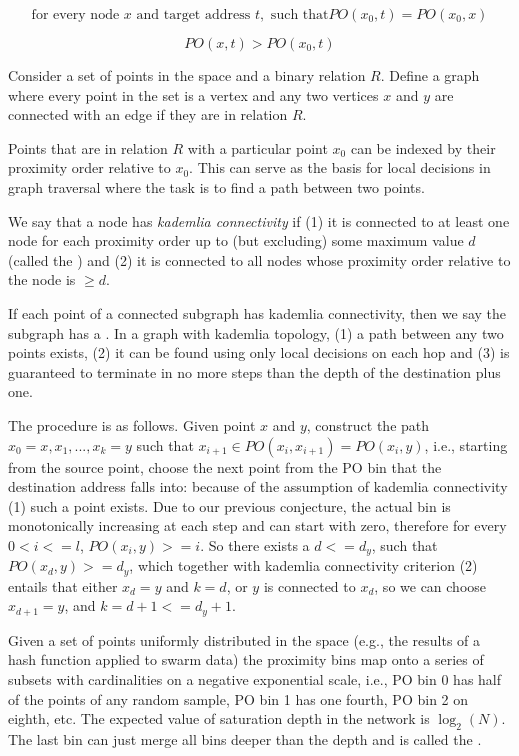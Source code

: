$$
\text{for every node } x \text{ and target address } t, \text{ such that} \mathit{PO}(x_0, t) = \mathit{PO}(x_0,x) 
$$

$$
\mathit{PO}(x, t) > \mathit{PO}(x_0, t) 
$$


Consider a set of points in the space and 
a binary relation $R$. Define a graph where every point in the set is a vertex and any two vertices $x$ and $y$ are  connected with an edge if they are in relation $R$. 

Points that are in relation $R$ with a particular point $x_0$ can be indexed by their proximity order relative to $x_0$. 
This can serve as the basis for local decisions in graph traversal where the task is to find a path between two
points. 

We say that a node has \emph{kademlia connectivity} if (1) it is connected to at least one node for each proximity order up to (but excluding) some maximum value $d$ (called the ) and (2) it is connected to all nodes whose proximity order relative to the node is  $\geqslant d$.

If each point of a connected subgraph has kademlia connectivity, then we say the subgraph has a . In a graph with kademlia topology, (1) a path between any two points exists, (2) it can be found using only local decisions on each hop and (3) is guaranteed to terminate in no more steps than the depth of the destination plus one. 

The procedure is as follows. Given point $x$ and $y$, construct the path $x_0=x , x_1, ..., x_k=y$ such that $x_{i+1}\in \mathit{PO}(x_i, x_{i+1})=\mathit{PO}(x_i, y)$, i.e., starting from the source point, choose the next point from the PO bin that the destination address falls into: because of the assumption of kademlia connectivity (1) such a point exists. Due to our previous conjecture, the actual bin is monotonically increasing at each step and can start with zero, therefore for every $0<i<=l$, $\mathit{PO}(x_{i}, y)>=i$. So there exists a $d<=d_y$, such that 
$\mathit{PO}(x_{d}, y)>=d_y$, which together with kademlia connectivity criterion (2) entails that either $x_d=y$ and $k=d$, or $y$ is connected to $x_d$, so we can choose $x_{d+1}=y$, and $k=d+1<=d_y+1$.

Given a set of points uniformly distributed in the space (e.g., the results of a hash function applied to swarm data) the proximity bins map onto a series of subsets with cardinalities on a negative exponential scale, i.e., PO bin 0 has half of the points of any random sample, PO bin 1 has one fourth, PO bin 2 on eighth, etc.
The expected value of saturation depth in the network is $\log_2(N)$. The last bin can just merge all bins deeper than the depth and is called the .

